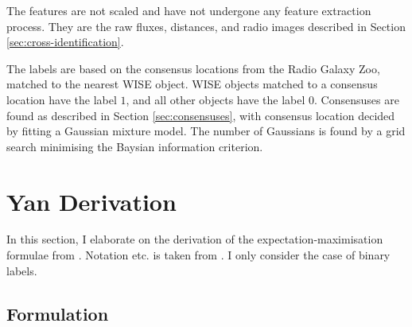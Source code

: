   The features are not scaled and have not undergone any feature extraction
  process. They are the raw fluxes, distances, and radio images described in
  Section \ref{sec:cross-identification}.

  The labels are based on the consensus locations from the Radio Galaxy Zoo,
  matched to the nearest WISE object. WISE objects matched to a consensus
  location have the label $1$, and all other objects have the label $0$.
  Consensuses are found as described in Section \ref{sec:consensuses}, with
  consensus location decided by fitting a Gaussian mixture model. The number of
  Gaussians is found by a grid search minimising the Baysian information
  criterion.


\section{Yan Derivation}
\label{sec:yan-derivation}
  In this section, I elaborate on the derivation of the expectation-maximisation formulae from \citet{yan10}. Notation etc. is taken from \citet{yan10}. I only consider the case of binary labels.

  \subsection{Formulation}

